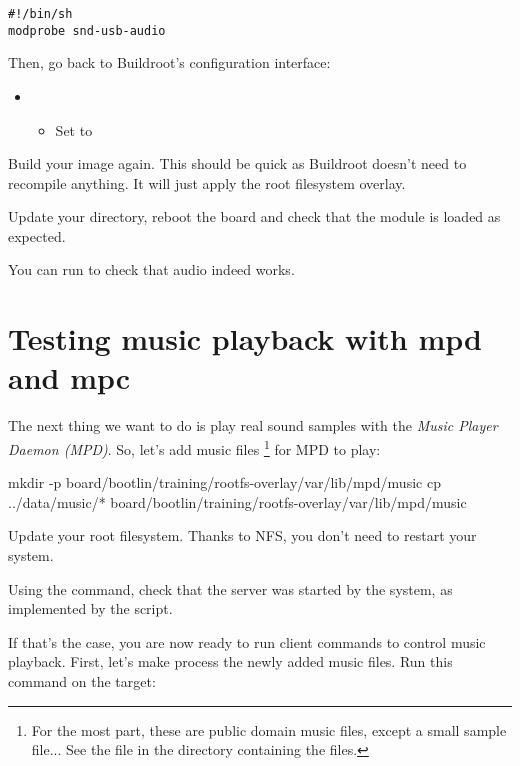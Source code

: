 \begin{verbatim}
#!/bin/sh
modprobe snd-usb-audio
\end{verbatim}

Then, go back to Buildroot's configuration interface:
\begin{itemize}
\item {}
  \begin{itemize}
  \item Set  to
  \end{itemize}
\end{itemize}

Build your image again. This should be quick as Buildroot doesn't need
to recompile anything. It will just apply the root filesystem overlay.

Update your  directory, reboot the board and check
that the  module is loaded as expected.

You can run  to check that audio indeed works.

\section{Testing music playback with mpd and mpc}

The next thing we want to do is play real sound samples with
the {\em Music Player Daemon (MPD)}. So, let's add music files
\footnote{For the most part, these are public domain
music files, except a small sample file... See the 
file in the directory containing the files.}
for MPD to play:

\begin{bashinput}
mkdir -p board/bootlin/training/rootfs-overlay/var/lib/mpd/music
cp ../data/music/* board/bootlin/training/rootfs-overlay/var/lib/mpd/music
\end{bashinput}

Update your root filesystem. Thanks to NFS, you don't need to restart
your system.

Using the  command, check that the  server
was started by the system, as implemented by the
 script.

If that's the case, you are now ready to run  client commands
to control music playback. First, let's make  process the
newly added music files. Run this command on the target:


